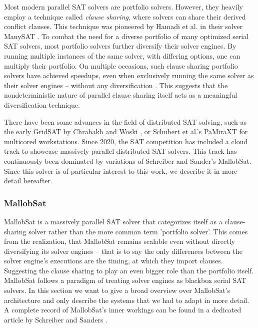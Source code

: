 \documentclass[12pt,a4paper,twoside]{scrartcl}
\numberwithin{equation}{section}
\begin{document}
Most modern parallel SAT solvers are portfolio solvers. However, they heavily employ a technique called \textit{clause sharing}, where solvers can share their derived conflict clauses. This technique was pioneered by Hamadi et al. in their solver ManySAT \cite{manySAT}. To combat the need for a diverse portfolio of many optimized serial SAT solvers, most portfolio solvers further diversify their solver engines. By running multiple instances of the same solver, with differing options, one can multiply their portfolio. On multiple occasions, such clause sharing portfolio solvers have achieved speedups, even when exclusively running the same solver as their solver engines -- without any diversification \cite{mallobSat, gimsatul}. This suggests that the nondeterministic nature of parallel clause sharing itself acts as a meaningful diversification technique.

There have been some advances in the field of distributed SAT solving, such as the early GridSAT by Chrabakh and Woski \cite{chrabakh2003gridsat}, or Schubert et al.'s PaMiraXT \cite{schubert2010pamiraxt} for multicored workstations. Since 2020, the SAT competition has included a cloud track to showcase massively parallel distributed SAT solvers. This track has continuously been dominated by variations of Schreiber and Sander's MallobSat. Since this solver is of particular interest to this work, we describe it in more detail hereafter.

\subsubsection{MallobSat}

MallobSat \cite{mallobSat} is a massively parallel SAT solver that categorizes itself as a clause-sharing solver rather than the more common term 'portfolio solver'. This comes from the realization, that MallobSat remains scalable even without directly diversifying its solver engines -- that is to say the only differences between the solver engine's executions are the timing, at which they import clauses. Suggesting the clause sharing to play an even bigger role than the portfolio itself. MallobSat follows a paradigm of treating solver engines as blackbox serial SAT solvers. In this section we want to give a broad overview over MallobSat's architecture and only describe the systems that we had to adapt in more detail. A complete record of MallobSat's inner workings can be found in a dedicated article by Schreiber and Sanders \cite{mallobSat}.
\end{document}
